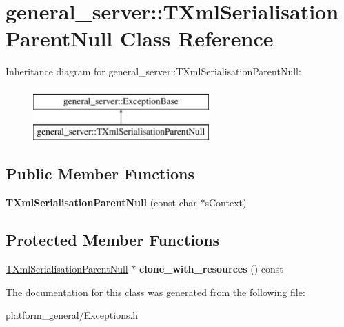 \hypertarget{classgeneral__server_1_1TXmlSerialisationParentNull}{\section{general\-\_\-server\-:\-:\-T\-Xml\-Serialisation\-Parent\-Null \-Class \-Reference}
\label{classgeneral__server_1_1TXmlSerialisationParentNull}
}
\-Inheritance diagram for general\-\_\-server\-:\-:\-T\-Xml\-Serialisation\-Parent\-Null\-:\begin{figure}[H]
\begin{center}
\leavevmode
\includegraphics[height=2.000000cm]{classgeneral__server_1_1TXmlSerialisationParentNull}
\end{center}
\end{figure}
\subsection*{\-Public \-Member \-Functions}
\begin{DoxyCompactItemize}
\item 
\hypertarget{classgeneral__server_1_1TXmlSerialisationParentNull_a5d9787a68e1b557e2038210a78ac89af}{{\bfseries \-T\-Xml\-Serialisation\-Parent\-Null} (const char $\ast$s\-Context)}\label{classgeneral__server_1_1TXmlSerialisationParentNull_a5d9787a68e1b557e2038210a78ac89af}

\end{DoxyCompactItemize}
\subsection*{\-Protected \-Member \-Functions}
\begin{DoxyCompactItemize}
\item 
\hypertarget{classgeneral__server_1_1TXmlSerialisationParentNull_ad1d94f0d6c959c9e23f3e55066b7c894}{\hyperlink{classgeneral__server_1_1TXmlSerialisationParentNull}{\-T\-Xml\-Serialisation\-Parent\-Null} $\ast$ {\bfseries clone\-\_\-with\-\_\-resources} () const }\label{classgeneral__server_1_1TXmlSerialisationParentNull_ad1d94f0d6c959c9e23f3e55066b7c894}

\end{DoxyCompactItemize}


\-The documentation for this class was generated from the following file\-:\begin{DoxyCompactItemize}
\item 
platform\-\_\-general/\-Exceptions.\-h\end{DoxyCompactItemize}

